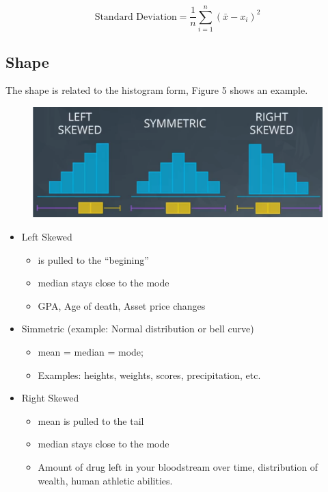 \documentclass[]{book}
\providecommand{\tightlist}{%
  \setlength{\itemsep}{0pt}\setlength{\parskip}{0pt}}
\begin{document}
\[ \text{Standard Deviation} = \frac{1}{n} \sum_{i = 1}^n (\bar x - x_i)^2 \tag{3}\]

\subsection{Shape}\label{shape}

The shape is related to the histogram form, Figure 5 shows an example.

\begin{figure}
\centering
\includegraphics{01-img/c4_l2_05.png}
\caption{}
\end{figure}

\begin{itemize}
\tightlist
\item
  Left Skewed

  \begin{itemize}
  \tightlist
  \item
    is pulled to the ``begining''
  \item
    median stays close to the mode
  \item
    GPA, Age of death, Asset price changes
  \end{itemize}
\item
  Simmetric (example: Normal distribution or bell curve)

  \begin{itemize}
  \tightlist
  \item
    mean = median = mode;
  \item
    Examples: heights, weights, scores, precipitation, etc.
  \end{itemize}
\item
  Right Skewed

  \begin{itemize}
  \tightlist
  \item
    mean is pulled to the tail
  \item
    median stays close to the mode
  \item
    Amount of drug left in your bloodstream over time, distribution of
    wealth, human athletic abilities.
  \end{itemize}
\end{itemize}
\end{document}
